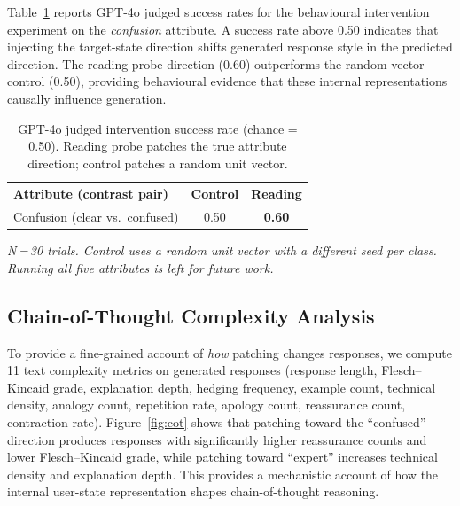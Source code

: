 \documentclass[11pt]{article}
\begin{document}
Table~\ref{tab:intervention} reports GPT-4o judged success rates for the
behavioural intervention experiment on the \emph{confusion} attribute.  A
success rate above 0.50 indicates that injecting the target-state direction
shifts generated response style in the predicted direction.  The reading probe
direction (0.60) outperforms the random-vector control (0.50), providing
behavioural evidence that these internal representations causally influence
generation.

\begin{table}[h]
\centering
\small
\caption{GPT-4o judged intervention success rate (chance = 0.50).
         Reading probe patches the true attribute direction;
         control patches a random unit vector.}
\label{tab:intervention}
\begin{tabular}{lcc}
\toprule
\textbf{Attribute (contrast pair)} & \textbf{Control} & \textbf{Reading} \\
\midrule
Confusion (clear vs.\ confused) & 0.50 & \textbf{0.60} \\
\bottomrule
\end{tabular}
\end{table}

\noindent\textit{N\,=\,30 trials. Control uses a random unit vector with a
different seed per class.  Running all five attributes is left for future work.}

\subsection{Chain-of-Thought Complexity Analysis}

To provide a fine-grained account of \emph{how} patching changes responses,
we compute 11 text complexity metrics on generated responses
(response length, Flesch--Kincaid grade, explanation depth, hedging frequency,
example count, technical density, analogy count, repetition rate, apology count,
reassurance count, contraction rate).
Figure~\ref{fig:cot} shows that patching toward the ``confused'' direction
produces responses with significantly higher reassurance counts and lower
Flesch--Kincaid grade, while patching toward ``expert'' increases technical
density and explanation depth.  This provides a mechanistic account of how the
internal user-state representation shapes chain-of-thought reasoning.

\end{document}
